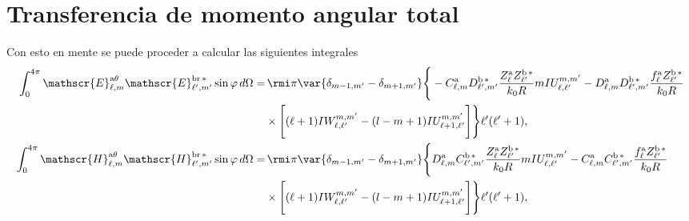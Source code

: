 \section{Transferencia de momento angular total}
Con esto en mente se puede proceder a calcular las siguientes integrales
\begin{align}
\int_{0}^{4\pi} \mathscr{E}_{\ell, m}^{\text{a}\theta}\mathscr{E}_{\ell^{\prime}, m^{\prime}}^{\text{br}\,*} \sin\varphi \, d\Omega =& 
%
\, \rmi \pi \var{ \delta_{m-1, m^{\prime}} - \delta_{m+1, m^{\prime}} } \Bigg\{-C_{\ell,m}^{\rm a}D_{\ell^{\prime}, m^{\prime}}^{\rm b \, *}\frac{Z_{\ell}^{\rm a}Z_{\ell^{\prime}}^{\rm b\, *}}{k_0 R} m IU_{\ell, \ell^{\prime}}^{m, m^{\prime}} 
%
-D_{\ell, m}^{\rm a}D_{\ell^{\prime}, m^{\prime}}^{\rm b \, *} \frac{f_{\ell}^{\rm a}Z_{\ell^{\prime}}^{\rm b \, *}}{k_0 R} \nonumber \\
%
& \times \Bigg[ (\ell+1) IW_{\ell, \ell^{\prime}}^{m, m^{\prime}} 
%
-(l-m+1) IU_{\ell + 1, \ell^{\prime}}^{m, m^{\prime}} \Bigg] \Bigg\}\ell^{\prime}(\ell^{\prime}+1),\\
%
%
\int_{0}^{4\pi} \mathscr{H}_{\ell, m}^{\text{a}\theta}\mathscr{H}_{\ell^{\prime}, m^{\prime}}^{\text{br}\,*} \sin\varphi \, d\Omega =& 
%
\, \rmi \pi \var{ \delta_{m-1, m^{\prime}} - \delta_{m+1, m^{\prime}} } \Bigg\{D_{\ell,m}^{\rm a}C_{\ell^{\prime}, m^{\prime}}^{\rm b \, *}\frac{Z_{\ell}^{\rm a}Z_{\ell^{\prime}}^{\rm b\, *}}{k_0 R} m IU_{\ell, \ell^{\prime}}^{m, m^{\prime}} 
%
-C_{\ell, m}^{\rm a}C_{\ell^{\prime}, m^{\prime}}^{\rm b \, *} \frac{f_{\ell}^{\rm a}Z_{\ell^{\prime}}^{\rm b \, *}}{k_0 R} \nonumber \\
%
& \times \Bigg[ (\ell+1) IW_{\ell, \ell^{\prime}}^{m, m^{\prime}} 
%
-(l-m+1) IU_{\ell + 1, \ell^{\prime}}^{m, m^{\prime}} \Bigg] \Bigg\}\ell^{\prime}(\ell^{\prime}+1),
%
%
%
%
\end{align}
\vspace{-0.8cm}
